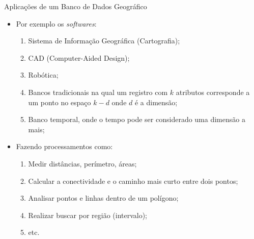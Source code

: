 		\begin{frame}{Aplicações de um Banco de Dados Geográfico}
			\begin{itemize}
				\setlength{\itemsep}{0.9em}
	
				\item Por exemplo os \textit{softwares}:
				\begin{enumerate}
					\setlength{\itemsep}{0.3em}
					\item Sistema de Informação Geográfica (Cartografia);
					\item CAD (Computer-Aided Design);
					\item Robótica;
					\item Bancos tradicionais na qual um registro com $k$ atributos corresponde a um ponto no espaço $k-d$ onde $d$ é a dimensão;
					\item Banco temporal, onde o tempo pode ser considerado uma dimensão a mais;
				\end{enumerate}

				\item Fazendo processamentos como:
				\begin{enumerate}
					\setlength{\itemsep}{0.3em}
					\item Medir distâncias, perímetro, áreas;
					\item Calcular a conectividade e o caminho mais curto entre dois pontos;
					\item Analisar pontos e linhas dentro de um polígono; 
					\item Realizar buscar por região (intervalo);
					\item etc.
				\end{enumerate}
			\end{itemize}
		\end{frame}


